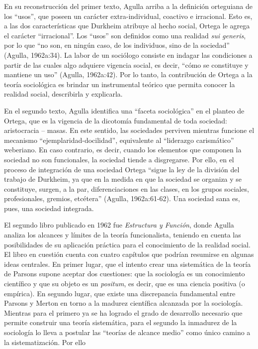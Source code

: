 En su reconstrucción del primer texto, Agulla arriba a la definición orteguiana de los \enquote{usos}, que poseen un carácter extra-individual, coactivo e irracional. Esto es, a las dos características que Durkheim atribuye al hecho social, Ortega le agrega el carácter \enquote{irracional}. Los \enquote{usos} son definidos como una realidad \emph{sui generis}, por lo que \enquote{no son, en ningún caso, de los individuos, sino de la sociedad} (Agulla, 1962a:34). La labor de un sociólogo consiste en indagar las condiciones a partir de las cuales algo adquiere vigencia social, es decir, \enquote{cómo se constituye y mantiene un uso} (Agulla, 1962a:42). Por lo tanto, la contribución de Ortega a la teoría sociológica es brindar un instrumental teórico que permita conocer la realidad social, describirla y explicarla.

En el segundo texto, Agulla identifica una \enquote{faceta sociológica} en el planteo de Ortega, que es la vigencia de la dicotomía fundamental de toda sociedad: aristocracia -- masas. En este sentido, las sociedades perviven mientras funcione el mecanismo \enquote{ejemplaridad-docilidad}, equivalente al \enquote{liderazgo carismático} weberiano. En caso contrario, es decir, cuando los elementos que componen la sociedad no son funcionales, la sociedad tiende a disgregarse. Por ello, en el proceso de integración de una sociedad Ortega \enquote{sigue la ley de la división del trabajo de Durkheim, ya que en la medida en que la sociedad se organiza y se constituye, surgen, a la par, diferenciaciones en las clases, en los grupos sociales, profesionales, gremios, etcétera} (Agulla, 1962a:61-62). Una sociedad sana es, pues, una sociedad integrada.

El segundo libro publicado en 1962 fue \emph{Estructura y Función}, donde Agulla analiza los alcances y límites de la teoría funcionalista, teniendo en cuenta las posibilidades de su aplicación práctica para el conocimiento de la realidad social. El libro en cuestión cuenta con cuatro capítulos que podrían resumirse en algunas ideas centrales. En primer lugar, que el intento crear una sistemática de la teoría de Parsons supone aceptar dos cuestiones: que la sociología es un conocimiento científico y que su objeto es un \emph{positum}, es decir, que es una ciencia positiva (o empírica). En segundo lugar, que existe una discrepancia fundamental entre Parsons y Merton en torno a la madurez científica alcanzada por la sociología. Mientras para el primero ya se ha logrado el grado de desarrollo necesario que permite construir una teoría sistemática, para el segundo la inmadurez de la sociología lo lleva a postular las \enquote{teorías de alcance medio} como único camino a la sistematización. Por ello

